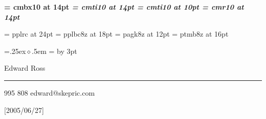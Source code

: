 \def\name{Edward Ross}
\def\addrone{}
\def\addrtwo{}
\def\phone{0403 995 808}
\def\email{edward@skepric.com}

\font\bf = cmbx10 at 14pt
\font\it = cmti10 at 14pt
\font\smallit = cmti10 at 10pt
\font\rm = cmr10 at 14pt

\def\nameReference#1{{\it #1}}

\font\titleFont = pplrc at 24pt
\font\headFont = pplbc8z at 18pt
\font\infoFont = pagk8z at 12pt
\font\sectionFont = ptmb8z at 16pt


\parskip=0pt
\parindent=0pt

\def\head#1{\vskip2pt\hfil\headFont #1\hfill\vskip3pt}

\def\startSkill{\relax}
\def\skill#1{\rm {\vskip10pt {\sectionFont #1}}\vskip6pt}
\def\endSkill{\relax}

\def\bullet{\leavevmode\raise .25ex\hbox{$\diamond$}\kern.5em}
\newdimen\bulletSize
{}=\hbox{\bullet}
\bulletSize=
\advance\bulletSize by 3pt 
\def\startExp#1#2#3{\rm{\sectionFont #1} \hfill {\it #2}\par\nobreak\vskip1pt\nobreak #3\par\nobreak\vskip2.5pt\nobreak\leftskip=0mm\parskip=1pt}
\def\exp#1{\hangindent=\bulletSize\hangafter=1%
\bullet #1 \par}
\def\endExp{\leftskip=0mm\parskip=0mm\vskip10pt}

\def\description#1{{\rm #1}}


\def\skilljump{\vskip2mm}


\def\pageHead{\hfil {\titleFont\name} \hfil
\vskip 3pt
\hrule 
\vskip 5pt
{\infoFont\phone} \hfill {\infoFont\markupEmail{\email}}\par
\vskip 2pt}


\ifx\pdfoutput\undefined
\def\markupEmail#1{#1}
\pageHead
\else
 
\beginpackages
  \usepackage{url}[2005/06/27]
  \usepackage{color}
\endpackages
\enablehyperlinks
{}

